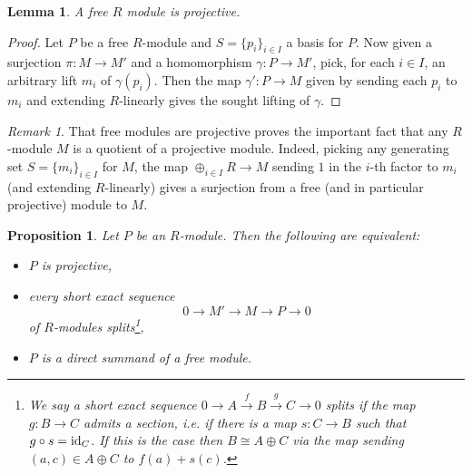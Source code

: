 \documentclass[11pt]{amsart}
\numberwithin{equation}{section}
\newtheorem{lemma}[equation]{Lemma}
\newtheorem{proposition}[equation]{Proposition}
\theoremstyle{remark}
\newtheorem{remark}[equation]{Remark}
\theoremstyle{remark}
\theoremstyle{remark}
\theoremstyle{definition}
\theoremstyle{definition}
\theoremstyle{definition}
\theoremstyle{definition}
\theoremstyle{definition}
\theoremstyle{definition}
\begin{document}
\begin{lemma} \label{free is projective}
A free $R$ module is projective.
\end{lemma}

\begin{proof}
Let $P$ be a free $R$-module and $S=\{p_i\}_{i\in I}$ a basis for $P$. Now given a surjection  $\pi:M\rightarrow M'$ and a homomorphism $\gamma:P\rightarrow M'$, pick, for each $i\in I$, an arbitrary lift $m_i$ of $\gamma(p_i)$. Then the map $\gamma':P\rightarrow M$ given by sending each $p_i$ to $m_i$ and extending $R$-linearly gives the sought lifting of $\gamma$. 
\end{proof}

\begin{remark}
That free modules are projective proves the important fact that any $R$-module $M$ is a quotient of a projective module. Indeed, picking any generating set $S=\{m_i\}_{i\in I}$ for $M$, the map $\oplus_{i\in I}R\rightarrow M$ sending $1$ in the $i$-th factor to $m_i$ (and extending $R$-linearly) gives a surjection from a free (and in particular projective) module to $M$. 
\end{remark}

\begin{proposition} \label{equiv proj defi}
Let $P$ be an $R$-module. Then the following are equivalent:
\begin{itemize}
\item[(1)] $P$ is projective,
\item[(2)] every short exact sequence 
\[0\rightarrow M' \rightarrow M \rightarrow P\rightarrow 0\]
of $R$-modules splits\footnote{We say a short exact sequence $0\rightarrow A\stackrel{f}{\rightarrow} B \stackrel{g}{\rightarrow} C\rightarrow 0$ \textit{splits} if the map $g:B\rightarrow C$ admits a section, i.e. if there is a map $s:C\rightarrow B$ such that $g\circ s=\textup{id}_C$. If this is the case then $B\cong A\oplus C$ via the map sending $(a,c)\in A\oplus C$ to $f(a)+s(c)$.},
\item[(3)] $P$ is a direct summand of a free module.
\end{itemize}
\end{proposition}
\end{document}
